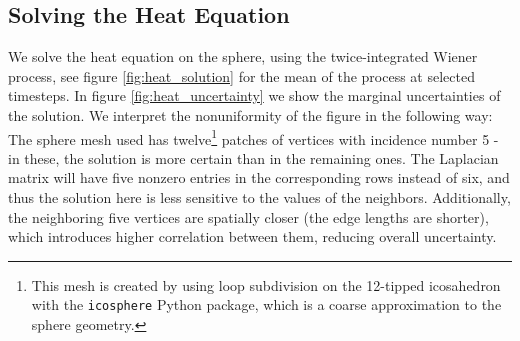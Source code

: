 \subsection*{Solving the Heat Equation}
We solve the heat equation on the sphere, using the twice-integrated Wiener process, see figure \ref{fig:heat_solution} for the mean of the process at selected timesteps. In figure \ref{fig:heat_uncertainty} we show the marginal uncertainties of the solution. We interpret the nonuniformity of the figure in the following way: The sphere mesh used has twelve\footnote{This mesh is created by using loop subdivision on the 12-tipped icosahedron with the \texttt{icosphere} Python package, which is a coarse approximation to the sphere geometry.} patches of vertices with incidence number 5 - in these, the solution is more certain than in the remaining ones. The Laplacian matrix will have five nonzero entries in the corresponding rows instead of six, and thus the solution here is less sensitive to the values of the neighbors. Additionally, the neighboring five vertices are spatially closer (the edge lengths are shorter), which introduces higher correlation between them, reducing overall uncertainty.

